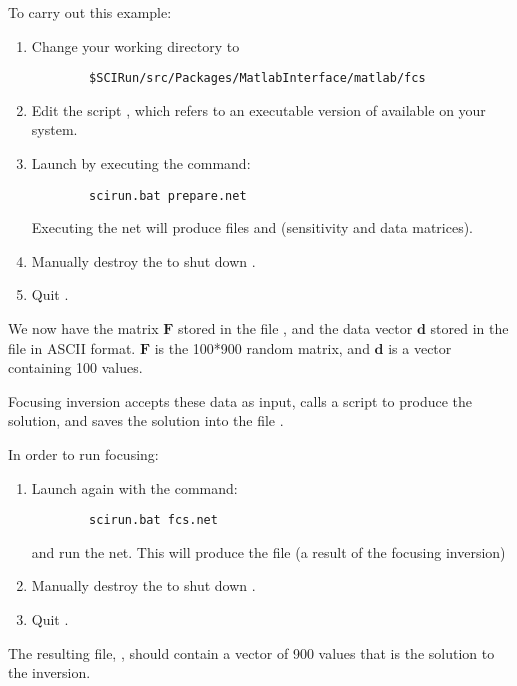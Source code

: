 To carry out this example:
%
\begin{enumerate}
  \item Change your working directory to
        \begin{verbatim}
        $SCIRun/src/Packages/MatlabInterface/matlab/fcs
        \end{verbatim}  
  \item Edit the script , which refers to an
        executable version of \sr{} available on your system.
  \item Launch \sr{} by executing the command:\\
        \begin{verbatim}
        scirun.bat prepare.net
        \end{verbatim} 
        Executing the net will produce files  
        and  (sensitivity and data matrices).
  \item Manually destroy the \mlm{} to shut down \m{}.
  \item Quit \sr{}.
\end{enumerate}

We now have the matrix $\mathbf{F}$ stored in the file ,
and the data vector $\mathbf{d}$ stored in the file 
in ASCII format.  $\mathbf{F}$ is the 100*900 random matrix, and
$\mathbf{d}$ is a vector containing 100 values.

Focusing inversion accepts these data as input, calls a \m{} script
 to produce the solution, and saves the solution into the
file .

In order to run focusing:
%
\begin{enumerate}
  \item Launch \sr{} again with the command:
        \begin{verbatim}
        scirun.bat fcs.net
        \end{verbatim}
        and run the net. This will produce the file 
        (a result of the focusing inversion)
  \item Manually destroy the \mlm{} to shut down \m{}. 
  \item Quit \sr{}.
\end{enumerate}

The resulting file, , should contain a vector of
900 values that is the solution to the inversion.

\ModuleRefDetails

